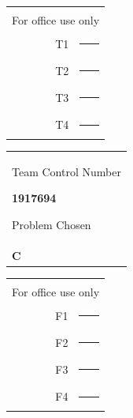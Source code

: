 \documentclass[13pt]{ctexart}
\begin{document}
\thispagestyle{empty}
\begin{table}[h]
	\tabcolsep=2pt 
	\begin{floatrow}
		\begin{minipage}[t]{7.1cm}
			\raggedright
			\renewcommand\arraystretch{1}
			\begin{tabular}[t]{rp{4em}}
				{ }\\[-8pt]
				\multicolumn{2}{l}{For office use only}\\ 
				T1 &  \rule{3cm}{0.15mm}\\ 
				T2 &  \rule{3cm}{0.15mm}\\ 
				T3 &  \rule{3cm}{0.15mm}\\  
				T4 &  \rule{3cm}{0.15mm}\\
			\end{tabular}
		\end{minipage}
		\begin{minipage}[b]{5.4cm}
			\renewcommand\arraystretch{1}
			\begin{tabular}[b]{p{10em}}
				\centering
				{Team Control Number
					
					{\color{red}\fontsize{14pt}{16pt}\selectfont\textbf{{1917694}}}
					
					\vspace{14pt}
					
					\normalsize Problem Chosen	
				}\\[10pt]
				{\color{red}\fontsize{24pt}{10pt}\selectfont\textbf{C}}
			\end{tabular}
		\end{minipage}
		\begin{minipage}[t]{5.4cm}
			\raggedleft
			\renewcommand\arraystretch{1}
			\begin{tabular}[t]{rp{4em}}
				{ }\\[-8pt]
				\multicolumn{2}{l}{For office use only} \\
				F1 &  \rule{3cm}{0.15mm}  \\ 
				F2 &  \rule{3cm}{0.15mm}  \\ 
				F3 &  \rule{3cm}{0.15mm}  \\ 
				F4 &  \rule{3cm}{0.15mm}  \\ 
			\end{tabular}
		\end{minipage}
	\end{floatrow}
\end{table}
\vspace{-18pt}
\noindent{\rule{\textwidth}{0.1mm}}
\end{document}
